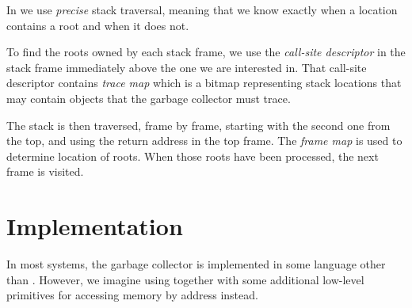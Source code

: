 In \sysname{} we use \emph{precise} stack traversal, meaning that we
know exactly when a location contains a root and when it does not.

To find the roots owned by each stack frame, we use the
\emph{call-site descriptor}  in the
stack frame immediately above the one we are interested in.  That
call-site descriptor contains \emph{trace map} which is a bitmap
representing stack locations that may contain objects that the garbage
collector must trace.

The stack is then traversed, frame by frame, starting with the second
one from the top, and using the return address in the top frame.
The \emph{frame map} is used to determine location of roots.
When those roots have been processed, the next frame is visited.

\section{Implementation}

In most systems, the garbage collector is implemented in some language
other than \commonlisp{}.  However, we imagine using \commonlisp{}
together with some additional low-level primitives for accessing
memory by address instead.

